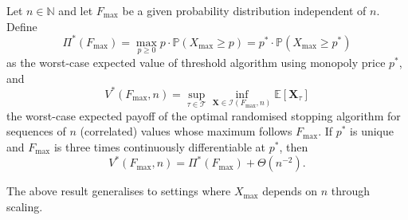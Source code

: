 \documentclass[11pt,a4paper]{article}
\numberwithin{equation}{section}
\newcommand{\N}{\mathbb{N}}
\begin{document}
\begin{theorem}
\label{thm:special-cases}
    Let $n \in \N$ and let $F_{\max}$ be a given probability distribution independent of $n$. Define
    $$
    \Pi^*(F_{\max}) = \max_{ p \geq 0} p \cdot\mathbb{P}(X_{\max}\ge p) = p^* \cdot\mathbb{P}(X_{\max}\ge p^*)
    $$
    as the worst-case expected value of threshold algorithm using monopoly price $p^*$, and 
    $$
    V^*(F_{\max}, n) = \sup_{\tau\in\mathcal{T}}\inf_{\boldsymbol{X}\in\mathcal{I}(F_{\max}, n)}\mathbb{E}[\boldsymbol{X}_{\tau}]
    $$
    the worst-case expected payoff of the optimal randomised stopping algorithm for sequences of $n$ (correlated) values whose maximum follows $F_{\max}$. 
    If $p^*$ is unique and $F_{\max}$ is three times continuously differentiable at $p^*$, then $$V^*(F_{\max}, n)=\Pi^*(F_{\max})+\Theta(n^{-2}).$$
\end{theorem}  
The above result generalises to settings where $X_{\max}$ depends on $n$ through scaling.
\end{document}
